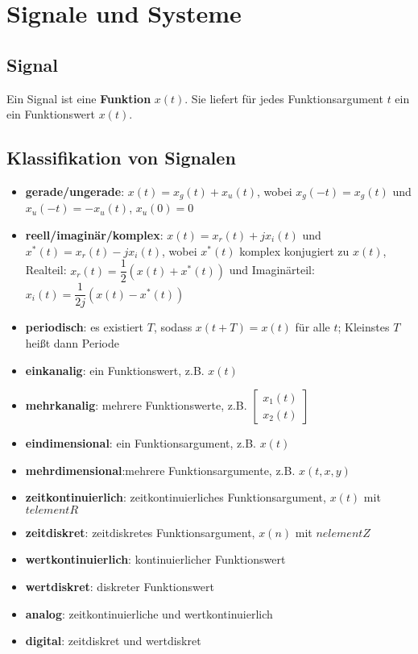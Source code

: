 \documentclass[10pt,a4paper]{article}
\author{Florian Euchner, Stefan Köbel, Chong Shen, Jan Frederik Dick}
\newcommand{\fancythumb}[2]{
	\addthumb{#1}{\large\sffamily\textbf{\space\space#1\vspace{5pt}}}{white}{#2}
}
\begin{document}
	\section{Signale und Systeme}
	\fancythumb{S\&S}{teal}
	\subsection{Signal}
	Ein Signal ist eine \textbf{Funktion} $x(t)$. Sie liefert für jedes Funktionsargument $t$ ein ein Funktionswert $x(t)$.
	\subsection{Klassifikation von Signalen}
	\begin{itemize}
	\item \textbf{gerade/ungerade}: $x(t)=x_g(t)+x_u(t)$, wobei $x_g(-t)=x_g(t)$ und $x_u(-t)=-x_u(t)$, $x_u(0)=0$
	\item \textbf{reell/imaginär/komplex}: $x(t)=x_r(t)+jx_i(t)$ und $x^*(t)=x_r(t)-jx_i(t)$, wobei $x^*(t)$ komplex konjugiert zu $x(t)$, Realteil: $x_r(t)=\dfrac{1}{2}(x(t)+x^*(t))$ und Imaginärteil: $x_i(t)=\dfrac{1}{2j}(x(t)-x^*(t))$ 
	\item \textbf{periodisch}: es existiert $T$, sodass $x(t+T)=x(t)$ für alle $t$; Kleinstes $T$ heißt dann Periode
	\item \textbf{einkanalig}: ein Funktionswert, z.B. $x(t)$
	\item \textbf{mehrkanalig}: mehrere Funktionswerte, z.B. $\begin{bmatrix}
	x_1(t) \\ 
	x_2(t)
	\end{bmatrix}$
	\item \textbf{eindimensional}: ein Funktionsargument, z.B. $x(t)$
	\item \textbf{mehrdimensional}:mehrere Funktionsargumente, z.B. $x(t,x,y)$
	\item \textbf{zeitkontinuierlich}: zeitkontinuierliches Funktionsargument, $x(t)$ mit $t element R$
	\item \textbf{zeitdiskret}: zeitdiskretes Funktionsargument, $x(n)$ mit $n element Z$
	\item \textbf{wertkontinuierlich}: kontinuierlicher Funktionswert
	\item \textbf{wertdiskret}: diskreter Funktionswert
	\item \textbf{analog}: zeitkontinuierliche und wertkontinuierlich
	\item \textbf{digital}: zeitdiskret und wertdiskret
	\end{itemize}
\end{document}
